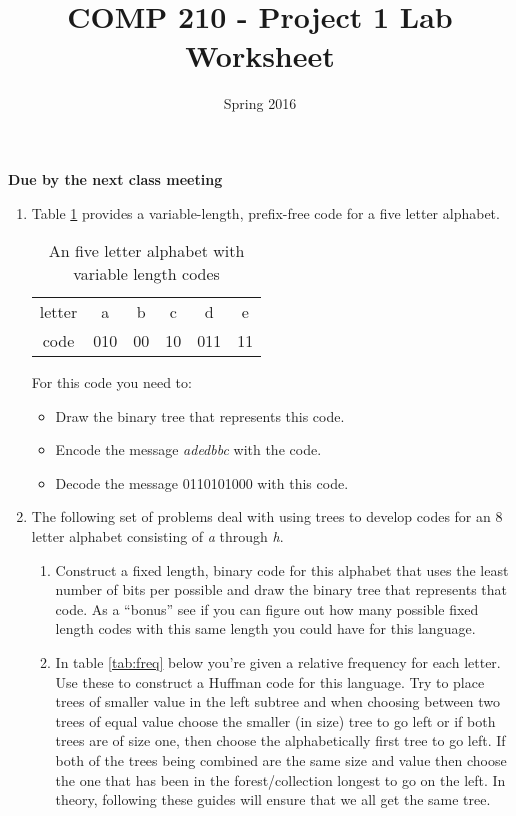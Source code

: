 \documentclass[]{article}
\title{COMP 210 - Project 1 Lab Worksheet}
\author{}
\date{Spring 2016}
\begin{document}
\maketitle
\thispagestyle{empty}

\begin{center}
\textbf{Due by the next class meeting}
\end{center}

\begin{enumerate}

\item Table \ref{tab:code} provides a variable-length, prefix-free code for a five letter alphabet. 
\begin{table}[!htpb]
\begin{center}
\begin{tabular}{cccccc}
letter    & a & b & c & d &  e \\
code & 010 &  00 & 10 &  011 & 11
\end{tabular}
\end{center}
\caption{An five letter alphabet with variable length codes}
\label{tab:code}
\end{table}

For this code you need to:
\begin{itemize}
\item Draw the binary tree that represents this code. 
\item Encode the message \textit{adedbbc} with the code. 
\item Decode the message 0110101000 with this code. 
\end{itemize}
\newpage \thispagestyle{empty}
\mbox{}
\newpage \thispagestyle{empty}

\item The following set of problems deal with using trees to develop codes for an 8 letter alphabet consisting of \textit{a} through \textit{h}.
\begin{enumerate}
\item Construct a fixed length, binary code for this alphabet that uses the least number of bits per possible and draw the binary tree that represents that code. As a ``bonus'' see if you can figure out how many possible fixed length codes with this same length you could have for this language.
\newpage \thispagestyle{empty}

\item In table \ref{tab:freq} below you're given a relative frequency for each letter. Use these to construct a Huffman code for this language. Try to place trees of smaller value in the left subtree and when choosing between two trees of equal value choose the smaller (in size) tree to go left or if both trees are of size one, then choose the alphabetically first tree to go left. If both of the trees being combined are the same size and value then choose the one that has been in the forest/collection longest to go on the left. In theory, following these guides will ensure that we all get the same tree. 


\end{enumerate}
\end{enumerate}
\end{document}
